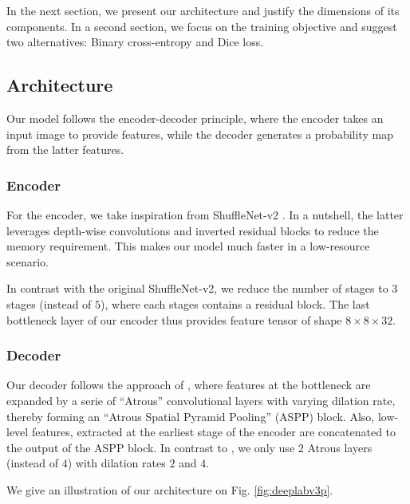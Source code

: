 \documentclass[11pt]{article}
\begin{document}
In the next section, we present our architecture and justify the dimensions of
its components.
In a second section, we focus on the training objective and suggest two alternatives: Binary cross-entropy and Dice loss.

\subsection{Architecture}
\label{sec:org4c83501}

Our model follows the encoder-decoder principle, where the encoder
takes an input image to provide
features, while the decoder generates a probability map from the latter features.

\subsubsection{Encoder}
\label{sec:orgfa25f78}

For the encoder, we take inspiration from ShuffleNet-v2 \cite{ma18}.
In a nutshell, the latter leverages depth-wise convolutions and
inverted residual blocks to reduce the memory requirement.
This makes our model much faster in a low-resource scenario.

In contrast with the original ShuffleNet-v2, we reduce the number
of stages to \(3\) stages (instead of \(5\)), where each stages contains a
residual block.
The last bottleneck layer of our encoder thus provides feature tensor of shape \(8\times8\times32\).

\subsubsection{Decoder}
\label{sec:org341037e}

Our decoder follows the approach of \cite{chen18}, where features at the bottleneck
are expanded by a serie of ``Atrous'' convolutional layers with varying dilation rate, thereby forming an ``Atrous Spatial Pyramid Pooling'' (ASPP) block.
Also, low-level features, extracted at the earliest stage of the encoder are concatenated
to the output of the ASPP block.
In contrast to \cite{chen18}, we only use \(2\) Atrous layers (instead of \(4\)) with dilation
rates \(2\) and \(4\).

We give an illustration of our architecture on Fig. \ref{fig:deeplabv3p}.
\end{document}
